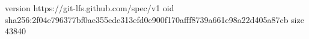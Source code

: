 version https://git-lfs.github.com/spec/v1
oid sha256:2f04e796377bf0ae355ede313efd0e900f170afff8739a661e98a22d405a87cb
size 43840
